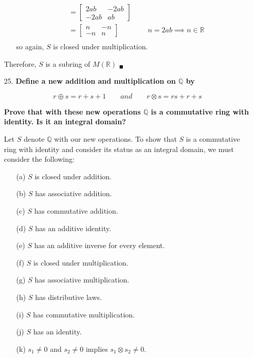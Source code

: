 \documentclass{article}
\begin{document}
\begin{enumerate}
\begin{enumerate}
\begin{align*}
  								  & = \begin{bmatrix} 2ab & -2ab \\ -2ab & ab \end{bmatrix} \\
  								  & = \begin{bmatrix} n & -n \\ -n & n \end{bmatrix} \qquad \qquad
  								  		n = 2ab \implies n \in \mathbb{R} \\
					\end{align*}
					so again, $S$ is closed under multiplication.
			\end{enumerate}

			Therefore, $S$ is a subring of $M(\mathbb{R})$ $_{\blacksquare}$

		\item [25.] \textbf{Define a new addition and multiplication on $\mathbb{Q}$ by }

					\begin{equation*}
						r \oplus s = r + s + 1 \qquad and \qquad r \otimes s = rs + r + s
					\end{equation*}

					\textbf{Prove that with these new operations $\mathbb{Q}$ is a commutative ring 
						with identity. Is it an integral domain?}

			Let $S$ denote $\mathbb{Q}$ with our new operations. To show that $S$ is a commutative 
			ring with identity and consider its status as an integral domain, we must consider the 
			following:

			\begin{enumerate}
				\item [(a)]$S$ is closed under addition.
				\item [(b)]$S$ has associative addition.
				\item [(c)]$S$ has commutative addition.
				\item [(d)]$S$ has an additive identity.
				\item [(e)]$S$ has an additive inverse for every element.
				\item [(f)]$S$ is closed under multiplication.
				\item [(g)]$S$ has associative multiplication.
				\item [(h)]$S$ has distributive laws.
				\item [(i)]$S$ has commutative multiplication.
				\item [(j)]$S$ has an identity.
				\item [(k)]$s_1 \neq 0$ and $s_2 \neq 0$ implies $s_1 \otimes s_2 \neq 0$.
			\end{enumerate}


\end{enumerate}
\end{document}

